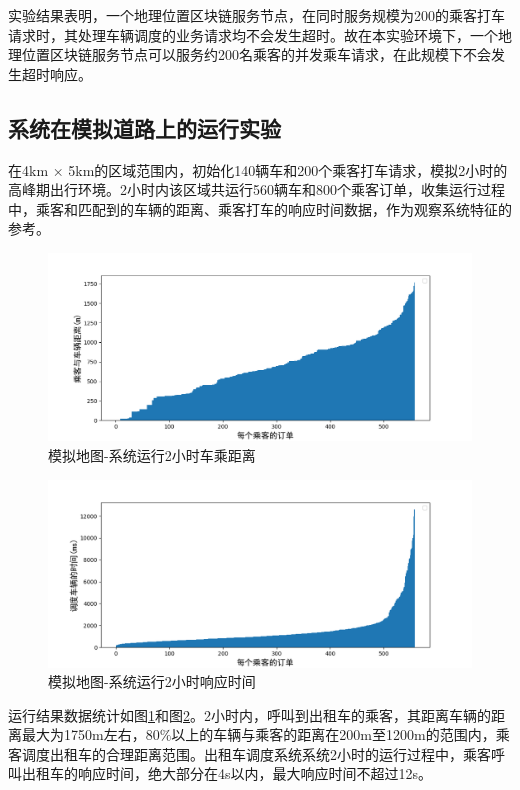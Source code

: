 实验结果表明，一个地理位置区块链服务节点，在同时服务规模为200的乘客打车请求时，其处理车辆调度的业务请求均不会发生超时。故在本实验环境下，一个地理位置区块链服务节点可以服务约200名乘客的并发乘车请求，在此规模下不会发生超时响应。

\subsection{系统在模拟道路上的运行实验}
在4km × 5km的区域范围内，初始化140辆车和200个乘客打车请求，模拟2小时的高峰期出行环境。2小时内该区域共运行560辆车和800个乘客订单，收集运行过程中，乘客和匹配到的车辆的距离、乘客打车的响应时间数据，作为观察系统特征的参考。

\begin{figure}[h]
  \centering
  \includegraphics[width=1.0\textwidth]{figures/2hDistance}
  \caption{模拟地图-系统运行2小时车乘距离}\label{fig:2hDistance}
\end{figure}

\begin{figure}[h]
  \centering
  \includegraphics[width=1.0\textwidth]{figures/2hTime}
  \caption{模拟地图-系统运行2小时响应时间}\label{fig:2hTime}
\end{figure}

运行结果数据统计如图\ref{fig:2hDistance}和图\ref{fig:2hTime}。2小时内，呼叫到出租车的乘客，其距离车辆的距离最大为1750m左右，80$\%$以上的车辆与乘客的距离在200m至1200m的范围内，乘客调度出租车的合理距离范围。出租车调度系统系统2小时的运行过程中，乘客呼叫出租车的响应时间，绝大部分在4s以内，最大响应时间不超过12s。

